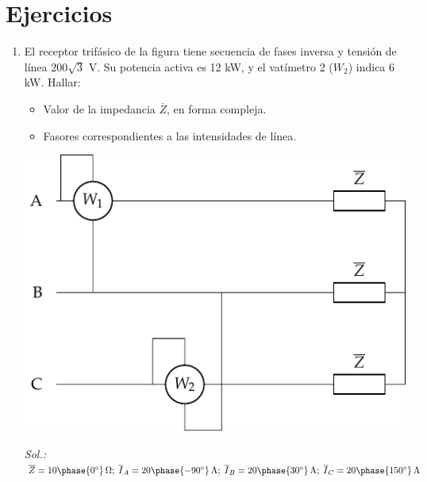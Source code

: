 \section{Ejercicios}
\begin{enumerate}

\item El receptor trifásico de la figura tiene secuencia de fases
  inversa y tensión de línea 200$\sqrt{3}$ V. Su potencia activa es 12
  kW, y el vatímetro 2 ($W_2$) indica 6 kW. Hallar:
  \begin{itemize}
  \item Valor de la impedancia $\overline{Z}$, en forma compleja.
  \item Fasores correspondientes a las intensidades de línea.
  \end{itemize}

\begin{center}
  \includegraphics[width=0.5\linewidth]{../figs/ej6_BT3.pdf}
\end{center}

\emph{Sol.:\;
  $\overline{Z}=10\phase{0^\circ}\,\Omega;\;
  \overline{I}_A={20\phase{-90^\circ}\,\mathrm{A}};\;
  \overline{I}_B={20\phase{30^\circ}\,\mathrm{A}};\;
  \overline{I}_C={20\phase{150^\circ}\,\mathrm{A}}$}



\end{enumerate}
